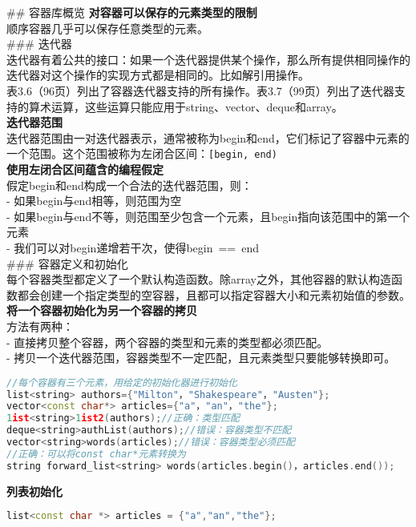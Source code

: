 \documentclass[
  a4paper,
  oneside,tablecaptionabove
]{scrbook}
\begin{document}
\#\# 容器库概览 \textbf{对容器可以保存的元素类型的限制}\\
顺序容器几乎可以保存任意类型的元素。\\
\#\#\# 迭代器\\
迭代器有着公共的接口：如果一个迭代器提供某个操作，那么所有提供相同操作的迭代器对这个操作的实现方式都是相同的。比如解引用操作。\\
表3.6（96页）列出了容器迭代器支持的所有操作。表3.7（99页）列出了迭代器支持的算术运算，这些运算只能应用于string、vector、deque和array。\\
\textbf{迭代器范围}\\
迭代器范围由一对迭代器表示，通常被称为begin和end，它们标记了容器中元素的一个范围。这个范围被称为左闭合区间：\lstinline![begin, end)!\\
\textbf{使用左闭合区间蕴含的编程假定}\\
假定begin和end构成一个合法的迭代器范围，则：\\
- 如果begin与end相等，则范围为空\\
-
如果begin与end不等，则范围至少包含一个元素，且begin指向该范围中的第一个元素\\
- 我们可以对begin递增若干次，使得begin~==~end\\
\#\#\# 容器定义和初始化\\
每个容器类型都定义了一个默认构造函数。除array之外，其他容器的默认构造函数都会创建一个指定类型的空容器，且都可以指定容器大小和元素初始值的参数。\\
\textbf{将一个容器初始化为另一个容器的拷贝}\\
方法有两种：\\
- 直接拷贝整个容器，两个容器的类型和元素的类型都必须匹配。\\
- 拷贝一个迭代器范围，容器类型不一定匹配，且元素类型只要能够转换即可。

\begin{lstlisting}[language={C++}]
//每个容器有三个元素，用给定的初始化器进行初始化
list<string> authors={"Milton"，"Shakespeare"，"Austen"};
vector<const char*> articles={"a"，"an"，"the"};
1ist<string>1ist2(authors);//正确：类型匹配
deque<string>authList(authors);//错误：容器类型不匹配
vector<string>words(articles);//错误：容器类型必须匹配
//正确：可以将const char*元素转换为
string forward_list<string> words(articles.begin()，articles.end());
\end{lstlisting}

\textbf{列表初始化}

\begin{lstlisting}[language={C++}]
list<const char *> articles = {"a","an","the"};
\end{lstlisting}
\end{document}
